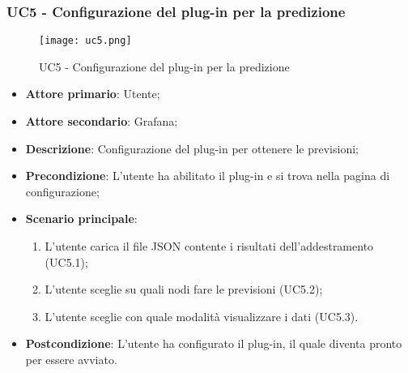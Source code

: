 \newpage
\subsubsection{UC5 - Configurazione del plug-in per la predizione}
\label{sssec:uc5}

\begin{figure}[h!]
  \begin{center}
    \texttt{[image: uc5.png]}\\
    \caption{UC5 - Configurazione del plug-in per la predizione}%
    \label{fig:uc3}
  \end{center}
  \end{figure}

  \begin{itemize}
    \item \textbf{Attore primario}: Utente;
    \item \textbf{Attore secondario}: Grafana;
    \item \textbf{Descrizione}: Configurazione del plug-in per ottenere le previsioni;
    \item \textbf{Precondizione}: L'utente ha abilitato il plug-in e si trova nella pagina di configurazione;
    \item \textbf{Scenario principale}:
    \begin{enumerate}
      \item L'utente carica il file JSON contente i risultati dell'addestramento (UC5.1);
      \item L'utente sceglie su quali nodi fare le previsioni (UC5.2);
      \item L'utente sceglie con quale modalità visualizzare i dati (UC5.3).
    \end{enumerate}
    \item \textbf{Postcondizione}: L'utente ha configurato il plug-in, il quale diventa pronto per essere avviato.
  \end{itemize}

